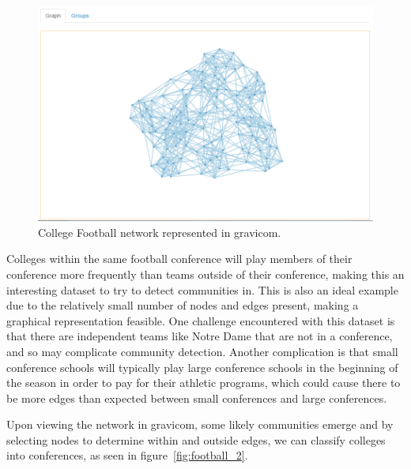 \documentclass{article}\usepackage[]{graphicx}\usepackage[]{color}
\begin{document}
\begin{figure}[hbtp]
\centering
\includegraphics[width=\textwidth]{images/football_1.png}
\caption{\label{fig:football_1} College Football network represented in gravicom.}
\end{figure}

Colleges within the same football conference will play members of their conference more frequently than teams outside of their conference, making this an interesting dataset to try to detect communities in. This is also an ideal example due to the relatively small number of nodes and edges present, making a graphical representation feasible. One challenge encountered with this dataset is that there are independent teams like Notre Dame that are not in a conference, and so may complicate community detection. Another complication is that small conference schools will typically play large conference schools in the beginning of the season in order to pay for their athletic programs, which could cause there to be more edges than expected between small conferences and large conferences.

Upon viewing the network in gravicom, some likely communities emerge and by selecting nodes to determine within and outside edges, we can classify colleges into conferences, as seen in figure~\ref{fig:football_2}.
\end{document}
